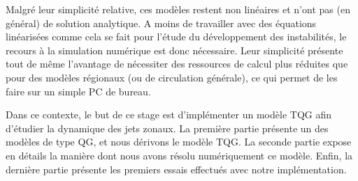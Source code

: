 Malgré leur simplicité relative, ces modèles restent non linéaires et n'ont pas (en général) de solution analytique. A moins de travailler avec des équations linéarisées comme cela se fait pour l'étude du développement des instabilités, le recours à la simulation numérique est donc nécessaire. Leur simplicité présente tout de même l'avantage de nécessiter des ressources de calcul plus réduites que pour des modèles régionaux (ou de circulation générale), ce qui permet de les faire  sur un simple PC de bureau.

Dans ce contexte, le but de ce stage est d'implémenter un modèle TQG afin d'étudier la dynamique des jets zonaux. La première partie présente un  des modèles de type QG, et nous dérivons le modèle TQG. La seconde partie expose en détails la manière dont nous avons résolu numériquement ce modèle. Enfin, la dernière partie présente les premiers essais effectués avec notre implémentation.
